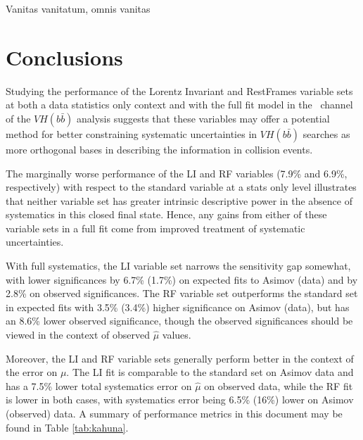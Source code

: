 \begin{savequote}[75mm]
Vanitas vanitatum, omnis vanitas
\end{savequote}

\chapter{Conclusions}

Studying the performance of the Lorentz Invariant and RestFrames variable sets at both a data statistics only context and with the full fit model in the \ZH\, channel of the $VH\left(b\bar{b}\right)$ analysis suggests that these variables may offer a potential method for better constraining systematic uncertainties in $VH\left(b\bar{b}\right)$ searches as more orthogonal bases in describing the information in collision events.  

The marginally worse performance of the LI and RF variables (7.9\% and 6.9\%, respectively) with respect to the standard variable at a stats only level illustrates that neither variable set has greater intrinsic descriptive power in the absence of systematics in this closed final state.  Hence, any gains from either of these variable sets in a full fit come from improved treatment of systematic uncertainties.

With full systematics, the LI variable set narrows the sensitivity gap somewhat, with lower significances by 6.7\% (1.7\%) on expected fits to Asimov (data) and by 2.8\% on observed significances.  The RF variable set outperforms the standard set in expected fits with 3.5\% (3.4\%) higher significance on Asimov (data), but has an 8.6\% lower observed significance, though the observed significances should be viewed in the context of observed $\hat{\mu}$ values.

Moreover, the LI and RF variable sets generally perform better in the context of the error on $\mu$.  The LI fit is comparable to the standard set on Asimov data and has a 7.5\% lower total systematics error on $\hat{\mu}$ on observed data, while the RF fit is lower in both cases, with systematics error being 6.5\% (16\%) lower on Asimov (observed) data.  A summary of performance metrics in this document may be found in Table \ref{tab:kahuna}.  


